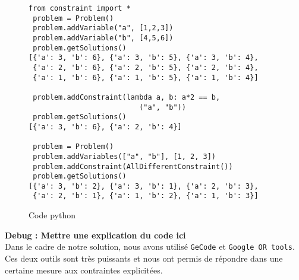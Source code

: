 \begin{figure}[!h]
\begin{lstlisting}[frame=single]
 from constraint import *
 problem = Problem()
 problem.addVariable("a", [1,2,3])
 problem.addVariable("b", [4,5,6])
 problem.getSolutions()
[{'a': 3, 'b': 6}, {'a': 3, 'b': 5}, {'a': 3, 'b': 4},
 {'a': 2, 'b': 6}, {'a': 2, 'b': 5}, {'a': 2, 'b': 4},
 {'a': 1, 'b': 6}, {'a': 1, 'b': 5}, {'a': 1, 'b': 4}]

 problem.addConstraint(lambda a, b: a*2 == b,
                          ("a", "b"))
 problem.getSolutions()
[{'a': 3, 'b': 6}, {'a': 2, 'b': 4}]

 problem = Problem()
 problem.addVariables(["a", "b"], [1, 2, 3])
 problem.addConstraint(AllDifferentConstraint())
 problem.getSolutions()
[{'a': 3, 'b': 2}, {'a': 3, 'b': 1}, {'a': 2, 'b': 3},
 {'a': 2, 'b': 1}, {'a': 1, 'b': 2}, {'a': 1, 'b': 3}]
\end{lstlisting}
\caption{Code python}
\end{figure}

\textbf{Debug : Mettre une explication du code ici}\\

Dans le cadre de notre solution, nous avons utilisé \texttt{GeCode} et \texttt{Google OR tools}. Ces deux outils sont très puissants et nous ont permis de répondre dans une certaine mesure aux contraintes explicitées.

